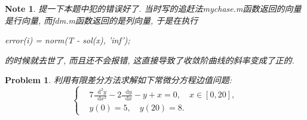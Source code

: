 \documentclass[a4paper, 12pt]{ctexart}
\let\oldlstlisting\lstlisting
\let\oldendlstlisting\endlstlisting
\renewenvironment{lstlisting}
    {\par\nolinenumbers\oldlstlisting}
    {\oldendlstlisting\endnolinenumbers\par}
\theoremstyle{plain}
\newtheorem{problem}{Problem}[section]
\theoremstyle{plain}
\theoremstyle{plain}
\newtheorem{note}{Note}[section]
\theoremstyle{nonumberplain}
\newcommand*{\diff}{\mathop{}\!\mathrm{d}}
\begin{document}
    \begin{note}
        提一下本题中犯的错误好了. 当时写的追赶法mychase.m函数返回的向量是行向量, 而fdm.m函数返回的是列向量, 于是在执行
        \begin{lstlisting}[
            caption=去世现场,
            style=MATLAB-editor,
            basicstyle=\mlttfamily\scriptsize,
            numberstyle={\color{black!33}\scriptsize\sffamily}
        ]
error(i) = norm(T - sol(x), 'inf');
        \end{lstlisting}
        的时候就去世了, 而且还不会报错, 这直接导致了收敛阶曲线的斜率变成了正的.
    \end{note}

    \begin{problem}
        \label{problem: 2}
        利用有限差分方法求解如下常微分方程边值问题:
        \begin{equation}
            \left\{
            \begin{aligned}
                &7\frac{\diff^{2}y}{\diff x^{2}}-2\frac{\diff y}{\diff x}-y+x=0,\quad x\in [0, 20],\\
                &y(0)=5,\quad y(20)=8.
            \end{aligned}
            \right.
        \end{equation}
    \end{problem}
\end{document}
